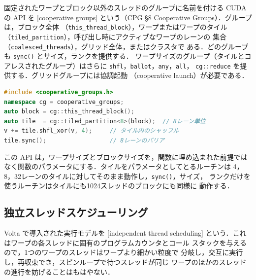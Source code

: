 \documentclass[../main.tex]{subfiles}
\begin{document}
\begin{definition}
  固定されたワープとブロック以外のスレッドのグループに名前を付ける CUDA
  の API を
  [cooperative groups]
  という（CPG §8 Cooperative Groups）．グループは，ブロック全体
  （\texttt{this\_thread\_block}），ワープまたはワープのタイル
  （\texttt{tiled\_partition}），呼び出し時にアクティブなワープのレーンの
  集合（\texttt{coalesced\_threads}），グリッド全体，またはクラスタで
  ある．どのグループも \texttt{sync()} とサイズ，ランクを提供する．
  ワープサイズのグループ（タイルとコアレスされたグループ）はさらに
  \texttt{shfl}，\texttt{ballot}，\texttt{any}，\texttt{all}，
  \texttt{cg::reduce} を提供する．グリッドグループには協調起動
  （cooperative launch）が必要である．
\end{definition}

\begin{lstlisting}[language=C++, numbers=none]
#include <cooperative_groups.h>
namespace cg = cooperative_groups;
auto block = cg::this_thread_block();
auto tile  = cg::tiled_partition<8>(block);  // 8レーン単位
v += tile.shfl_xor(v, 4);     // タイル内のシャッフル
tile.sync();                  // 8レーンのバリア
\end{lstlisting}
この API は，ワープサイズとブロックサイズを，関数に埋め込まれた前提では
なく関数のパラメータにする．タイルをパラメータとしてとるルーチンは
4，8，32レーンのタイルに対してそのまま動作し，\texttt{sync()}，サイズ，
ランクだけを使うルーチンはタイルにも1024スレッドのブロックにも同様に
動作する．

\subsection{独立スレッドスケジューリング}

\begin{definition}[独立スレッドスケジューリング]
  Volta で導入された実行モデルを
  [independent thread scheduling]
  という．これはワープの各スレッドに固有のプログラムカウンタとコール
  スタックを与えるので，1つのワープのスレッドはワープより細かい粒度で
  分岐し，交互に実行し，再収束でき，スピンループで待つスレッドが同じ
  ワープのほかのスレッドの進行を妨げることはもはやない．
\end{definition}
\end{document}
